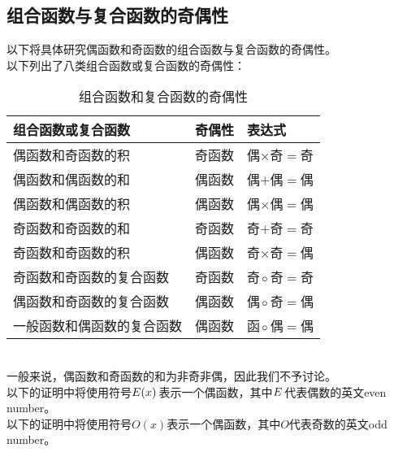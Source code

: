 \documentclass[UTF8]{ctexart}
\begin{document}
\newpage

\subsection{组合函数与复合函数的奇偶性}
    以下将具体研究偶函数和奇函数的组合函数与复合函数的奇偶性。\\[3mm]
    以下列出了八类组合函数或复合函数的奇偶性：\vspace{3pt}
    \begin{table}[h]
        \begin{center}
            \begin{tabular}{p{160pt}|p{60pt}|p{120pt}}
                \hline
                组合函数或复合函数&奇偶性&表达式\\ \hline
                偶函数和奇函数的积&奇函数&偶$\times$奇$=$奇\\ \hline
                偶函数和偶函数的和&偶函数&偶$+$偶$=$偶\\ \hline
                偶函数和偶函数的积&偶函数&偶$\times$偶$=$偶\\ \hline
                奇函数和奇函数的和&奇函数&奇$+$奇$=$奇\\ \hline
                奇函数和奇函数的积&偶函数&奇$\times$奇$=$偶\\ \hline
                奇函数和奇函数的复合函数&奇函数&奇$\hspace{1.5pt}\circ\hspace{1.5pt}$奇$=$奇\\ \hline
                偶函数和奇函数的复合函数&偶函数&偶$\hspace{1.5pt}\circ\hspace{1.5pt}$奇$=$偶\\ \hline
                一般函数和偶函数的复合函数&偶函数&函$\hspace{1.5pt}\circ\hspace{1.5pt}$偶$=$偶\\ \hline
            \end{tabular}
            \caption{组合函数和复合函数的奇偶性}
        \end{center}
    \end{table}\\
    一般来说，偶函数和奇函数的和为非奇非偶，因此我们不予讨论。\\[3mm]
    以下的证明中将使用符号$E(x)\hspace{1.5pt}$表示一个偶函数，其中$E\hspace{1.5pt}$代表偶数的英文even number。\\[3mm]
    以下的证明中将使用符号$O(x)$表示一个偶函数，其中$O$代表奇数的英文odd number。\vspace{2pt}
\end{document}
